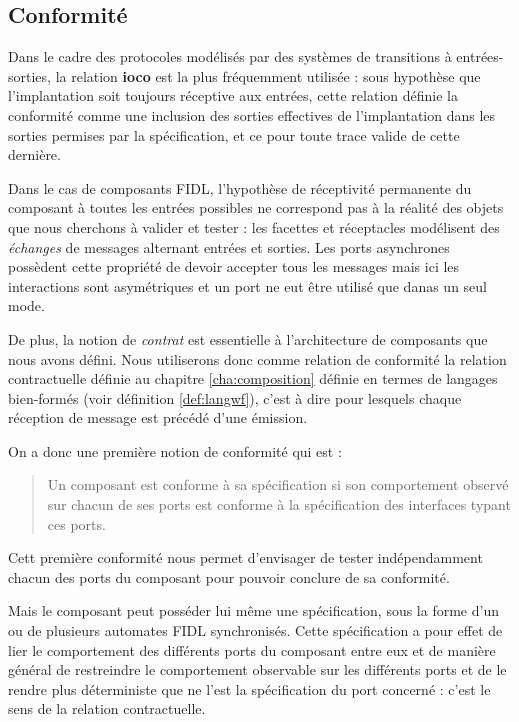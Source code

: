 \subsection{Conformit\'e}

Dans le cadre des protocoles
mod\'elis\'es par des syst\`emes de transitions \`a
entr\'ees-sorties, la relation \textbf{ioco} est la plus
fr\'equemment utilis\'ee : sous hypoth\`ese que l'implantation
soit toujours r\'eceptive aux entr\'ees, cette relation
d\'efinie la conformit\'e comme une inclusion des sorties
effectives de l'implantation dans les sorties permises par la
sp\'ecification, et ce pour toute trace valide de cette derni\`ere.

Dans le cas de composants FIDL, l'hypoth\`ese de r\'eceptivit\'e
permanente du composant \`a toutes les entr\'ees possibles ne
correspond pas \`a la r\'ealit\'e des objets que nous cherchons
\`a valider et tester : les facettes et r\'eceptacles mod\'elisent
des \emph{\'echanges} de messages alternant entr\'ees et
sorties. Les ports asynchrones poss\`edent cette propri\'et\'e de
devoir accepter tous les messages mais ici les interactions sont
asym\'etriques et un port ne eut \^etre utilis\'e que danas un seul
mode. 

De plus, la  notion de \emph{contrat} est
essentielle \`a l'architecture de composants que nous avons d\'efini.
Nous utiliserons donc comme relation de conformit\'e la relation
contractuelle d\'efinie au chapitre \ref{cha:composition} d\'efinie  en termes de langages bien-form\'es
(voir d\'efinition \ref{def:langwf}), c'est \`a dire pour lesquels
chaque r\'eception de message est pr\'ec\'ed\'e d'une \'emission. 

On a donc une premi\`ere notion de conformit\'e qui est : 
\begin{quote}
    Un composant est conforme \`a sa sp\'ecification si son
    comportement observ\'e sur chacun de ses ports est conforme
    \`a la sp\'ecification des interfaces typant ces ports.
\end{quote}
Cett premi\`ere conformit\'e nous permet d'envisager de tester
ind\'ependamment chacun des ports du composant pour pouvoir conclure
de sa conformit\'e.

Mais le composant peut poss\'eder lui m\^eme une sp\'ecification,
sous la forme d'un ou de plusieurs automates \textsf{FIDL} 
synchronis\'es. Cette sp\'ecification a pour effet de lier le
comportement des diff\'erents ports du composant entre
eux et de mani\`ere g\'en\'eral de restreindre le comportement
observable sur les diff\'erents ports et de le rendre plus
d\'eterministe que ne l'est la sp\'ecification du port concern\'e :
c'est le sens de la relation contractuelle.

